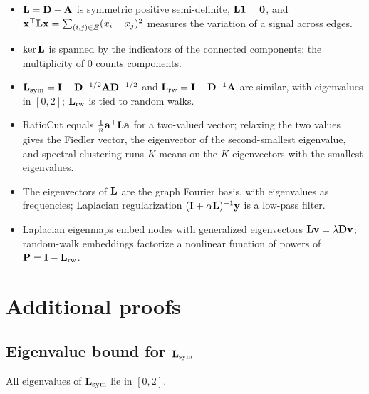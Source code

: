 \begin{notechapter}
\begin{chaptersummary}
\begin{itemize}
  \item $\mathbf{L} = \mathbf{D} - \mathbf{A}$ is symmetric positive semi-definite, $\mathbf{L}\mathbf{1} = \mathbf 0$, and $\mathbf{x}^\top\mathbf{L}\mathbf{x} = \sum_{(i,j)\in E}(x_i - x_j)^2$ measures the variation of a
        signal across edges.
  \item $\ker\mathbf{L}$ is spanned by the indicators of the connected components: the multiplicity of $0$ counts
        components.
  \item $\mathbf{L}_{\text{sym}} = \mathbf{I} - \mathbf{D}^{-1/2}\mathbf{A}\mathbf{D}^{-1/2}$ and $\mathbf{L}_{\text{rw}} = \mathbf{I} - \mathbf{D}^{-1}\mathbf{A}$ are similar, with eigenvalues in $[0, 2]$; $\mathbf{L}_{\text{rw}}$ is tied to random walks.
  \item RatioCut equals $\frac1n\mathbf a^\top\mathbf{L}\mathbf a$ for a two-valued vector; relaxing the two values gives the Fiedler vector, the
        eigenvector of the second-smallest eigenvalue, and spectral clustering runs $K$-means on the
        $K$ eigenvectors with the smallest eigenvalues.
  \item The eigenvectors of $\mathbf{L}$ are the graph Fourier basis, with eigenvalues as frequencies; Laplacian
        regularization $(\mathbf{I} + \alpha\mathbf{L})^{-1}\mathbf{y}$ is a low-pass filter.
  \item Laplacian eigenmaps embed nodes with generalized eigenvectors $\mathbf{L}\mathbf{v} = \lambda\mathbf{D}\mathbf{v}$; random-walk embeddings factorize a
        nonlinear function of powers of $\mathbf{P} = \mathbf{I} - \mathbf{L}_{\text{rw}}$.
\end{itemize}
\end{chaptersummary}

\chapterappendix
\section{Additional proofs}

\subsection{Eigenvalue bound for $\mathbf{L}_{\text{sym}}$}
\label{graph-laplacians:app:eigenvalue-bound}

\begin{proposition}\label{graph-laplacians:prop:eigenvalue-bound}
All eigenvalues of $\mathbf{L}_{\text{sym}}$ lie in $[0, 2]$.
\end{proposition}


\end{notechapter}

